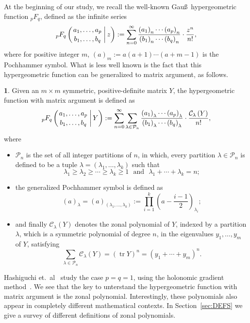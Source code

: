 \documentclass[10pt,oneside,american]{amsart}
\numberwithin{equation}{section}
\numberwithin{figure}{section}
\theoremstyle{plain}
\theoremstyle{definition}
\newtheorem{defn}[thm]{\protect\definitionname}
\theoremstyle{remark}
\theoremstyle{plain}
\theoremstyle{definition}
\theoremstyle{plain}
\theoremstyle{plain}
\DeclareMathOperator{\Tr}{tr}
\providecommand{\definitionname}{Definition}
\begin{document}
At the beginning of our study, we recall the well-known Gau\ss\ hypergeometric
function ${}_pF_q$, defined as the infinite series
\[
  {}_pF_q\left(\genfrac{}{}{0pt}{}{a_{1},\ldots,a_{p}}{b_{1},\ldots,b_{q}}\,\bigg|\,z\right) :=
  \sum_{n=0}^{\infty}\frac{\left(a_{1}\right)_{n}\cdots\left(a_{p}\right)_{n}}{\left(b_{1}\right)_{n}\cdots\left(b_{q}\right)_{n}}\cdot\frac{z^{n}}{n!},
\]
where for positive integer $m$,  $\left(a\right)_{m}:=a\left(a+1\right)\cdots\left(a+m-1\right)$ is the Pochhammer symbol.
What is less well known is the fact that this hypergeometric function can be
generalized to matrix argument, as follows.
\begin{defn}
Given an $m\times m$ symmetric, positive-definite matrix $Y$, the
hypergeometric function with matrix argument is defined as 
\begin{equation}\label{eq:MatrixpFq}
  {}_{p}F_{q}\left(\genfrac{}{}{0pt}{}{a_{1},\ldots,a_{p}}{b_{1},\ldots,b_{q}}\,\bigg|\,Y\right) :=
  \sum_{n=0}^{\infty}\sum_{\lambda\in\mathcal{P}_{n}}\frac{\left(a_{1}\right)_{\lambda}\cdots\left(a_{p}\right)_{\lambda}}
      {\left(b_{1}\right)_{\lambda}\cdots\left(b_{q}\right)_{\lambda}}\cdot\frac{\mathcal{C}_{\lambda}\left(Y\right)}{n!},
\end{equation}
where 
\begin{itemize}
\item $\mathcal{P}_{n}$ is the set of all integer partitions of $n$, in which,
every partition $\lambda\in\mathcal{P}_{n}$ is defined to be a tuple
$\lambda=\left(\lambda_{1},\ldots,\lambda_{k}\right)$ such that 
\[
\lambda_{1}\geq\lambda_{2}\geq\cdots\geq\lambda_{k}\geq 1\ \ \ \text{and}\ \ \  \lambda_{1}+\cdots+\lambda_{k}=n;
\]
\item the generalized Pochhammer symbol is defined as
\[
\left(a\right)_{\lambda}=\left(a\right)_{\left(\lambda_{1},\dots,\lambda_{k}\right)}:=\prod_{i=1}^{k}\left(a-\frac{i-1}{2}\right)_{\lambda_{i}};
\]
\item and finally $\mathcal{C}_{\lambda}(Y)$ denotes the zonal polynomial
of $Y$, indexed by a partition $\lambda$, which is a symmetric polynomial
of degree $n$, in the eigenvalues $y_{1},\ldots,y_{m}$ of $Y$,
satisfying 
\begin{equation}
\sum_{\lambda\in\mathcal{P}_{n}}\mathcal{C}_{\lambda}\left(Y\right)=\left(\Tr Y\right)^{n}=\left(y_{1}+\cdots+y_{m}\right)^{n}.\label{eq:TrZonal}
\end{equation}
\end{itemize}
\end{defn}
Hashiguchi et.~al~\cite{Hashiguchi} study the case $p=q=1$, using the
holonomic gradient method~\cite{NakayamaEtAl11}. We see that the key to
unterstand the hypergeometric function with matrix argument is the zonal
polynomial. Interestingly, these polynomials also appear in completely
different mathematical contexts.  In Section~\ref{sec:DEFS} we give a survey
of different definitions of zonal polynomials.
\end{document}
